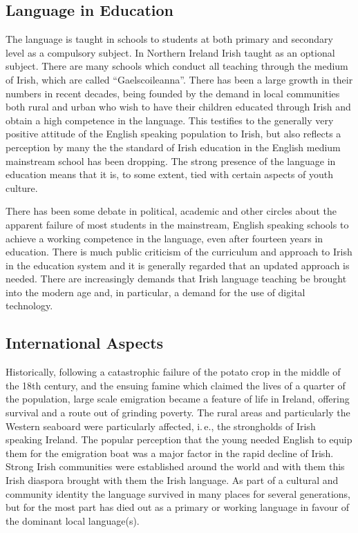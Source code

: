 \begin{multicols}{2}
\subsection{Language in Education}

The language is taught in schools to students at both primary and secondary level as a compulsory subject. In Northern Ireland Irish taught as an optional subject. There are many schools  which conduct all teaching through the medium of Irish, which are called  ``Gaelscoileanna''. There has been a large growth in their numbers in recent decades, being founded by the demand in local communities both rural and urban who wish to have their children educated through Irish and obtain a high competence in the language. This testifies to the generally very positive attitude of the English speaking population to Irish, but also reflects a perception by many the the standard of Irish education in the English medium mainstream school has been dropping. The strong presence of the language in education means that it is, to some extent, tied with certain aspects of youth culture. 

There has been some debate in political, academic and other circles about the apparent failure of most students in the mainstream, English speaking schools to achieve a working competence in the language, even after fourteen years in education. There is much public criticism of the curriculum and approach to Irish in the education system and it is generally regarded that an updated approach is needed. There are increasingly demands that Irish language teaching be brought into the modern age and, in particular, a demand for the use of digital technology.

\subsection{International Aspects}

Historically, following a catastrophic failure of the potato crop in the middle of the 18th century, and the ensuing famine which claimed the lives of a quarter of the population, large scale emigration became a feature of life in Ireland, offering survival and a route out of grinding poverty. The rural areas and particularly the Western seaboard were particularly affected, i.\,e., the strongholds of Irish speaking Ireland.  The popular perception that the young needed English to equip them for the emigration boat was a major factor in the rapid decline of Irish. Strong Irish communities were established around the world and with them this Irish diaspora brought with them the Irish language. As part of a cultural and community identity the language survived in many places for several generations, but for the most part has died out as a primary or working language in favour of the dominant local language(s). 


\end{multicols}
